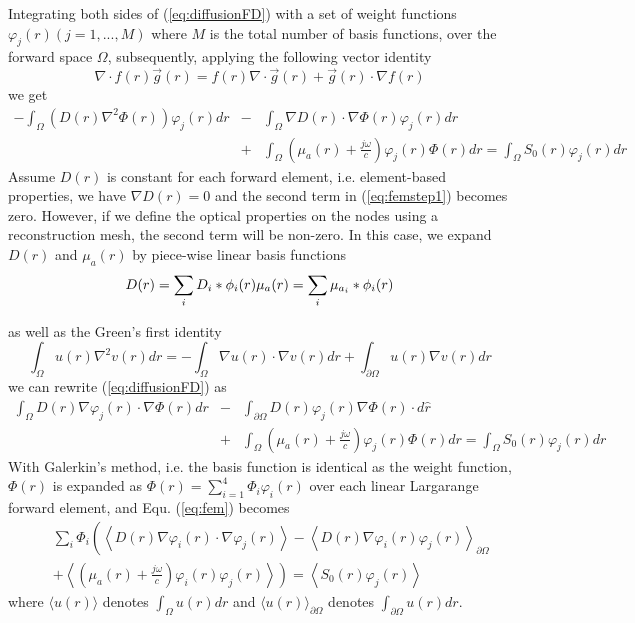 \documentclass{article}
\begin{document}
Integrating both sides of (\ref{eq:diffusionFD}) with a set of weight functions $\varphi_j(r) (j=1,...,M)$
where $M$ is the total number of basis functions, over the forward space $\Omega$, subsequently, applying the following vector
identity
\begin{equation}
\label{eq:veciden}\nabla\cdot f(r)\vec{g}(r)=f(r)\nabla\cdot
\vec{g}(r)+\vec{g}(r)\cdot\nabla f(r)
\end{equation}
we get
\begin{eqnarray}
\label{eq:femstep1}
-\int_{\Omega}{(D(r)\nabla^2\Phi(r))\varphi_j(r)dr}&-&\int_{\Omega}{\nabla D(r)\cdot\nabla\Phi(r)
\varphi_j(r)dr}\\\nonumber &+&\int_{\Omega}
{(\mu_a(r)+\frac{j\omega}{c})\varphi_j(r)\Phi(r)dr}=\int_{\Omega}
{S_0(r)\varphi_j(r)dr}
\end{eqnarray}
Assume $D(r)$ is constant for each forward element, i.e. element-based properties, 
we have $\nabla D(r)=0$ and the second term in (\ref{eq:femstep1}) becomes zero. 
However, if we define the optical properties on the nodes using a reconstruction mesh,
the second term will be non-zero. In this case, we expand $D(r)$ and $\mu_{a}(r)$ by
piece-wise linear basis functions
\begin{equation}
\label{eq:parammesh}D(r)=\sum_{i}D_i*\phi_i(r) \\
\mu_{a}(r)=\sum_{i}\mu_{a_i}*\phi_i(r)
\end{equation}

as well as the Green's first identity
\begin{equation}
\label{eq:Green1} \int_{\Omega}{u(r)\nabla^2
v(r)dr}=-\int_{\Omega}{\nabla u(r)\cdot\nabla
v(r)dr}+\int_{\partial\Omega} {u(r)\nabla v(r)dr}
\end{equation}
we can rewrite (\ref{eq:diffusionFD}) as
\begin{eqnarray}
\label{eq:fem}
\int_{\Omega}{D(r)\nabla\varphi_j(r)\cdot\nabla\Phi(r)dr}&-&\int_{\partial\Omega}{D(r)\varphi_j(r)\nabla\Phi(r)\cdot
d\hat{r}}\\\nonumber &+&\int_{\Omega}
{(\mu_a(r)+\frac{j\omega}{c})\varphi_j(r)\Phi(r)dr}=\int_{\Omega}
{S_0(r)\varphi_j(r)dr}
\end{eqnarray}
With Galerkin's method, i.e. the basis function is identical as
the weight function, $\Phi(r)$ is expanded as
$\Phi(r)=\sum_{i=1}^{4}\Phi_i\varphi_i(r)$ over each linear
Largarange forward element, and Equ. (\ref{eq:fem}) becomes
\begin{eqnarray}
\label{eq:galerkin}\nonumber&&\sum_{i}\Phi_i\left(\left\langle
D(r)\nabla\varphi_i(r)\cdot\nabla\varphi_j(r)\right\rangle -
\left\langle
D(r)\nabla\varphi_i(r)\varphi_j(r)\right\rangle_{\partial\Omega}\right.
\\&&+ \left.\left\langle
\left(\mu_a(r)+
\frac{j\omega}{c}\right)\varphi_i(r)\varphi_j(r)\right\rangle\right)=\left\langle
S_0(r)\varphi_j(r)\right\rangle
\end{eqnarray}
where $\langle u(r)\rangle$ denotes $\int_{\Omega}u(r)dr$ and
$\langle u(r)\rangle_{\partial\Omega}$ denotes
$\int_{\partial\Omega}u(r) dr$.
\end{document}

